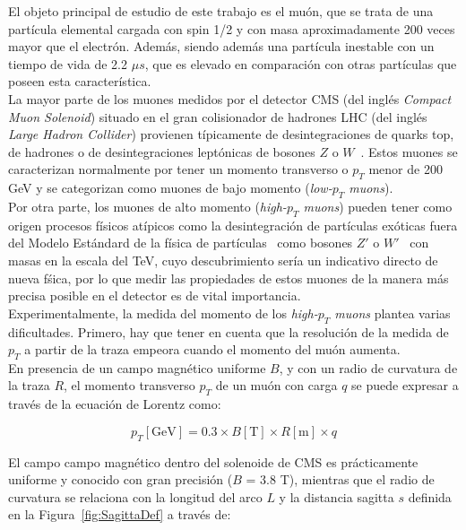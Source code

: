 
El objeto principal de estudio de este trabajo es el mu\'on, que se trata de una part\'icula elemental cargada con spin 1/2 y con masa aproximadamente 200 veces mayor que el electr\'on. Adem\'as, siendo adem\'as una part\'icula inestable con un tiempo de vida de 2.2 $\mu s$, que es elevado en comparaci\'on con otras part\'iculas que poseen esta caracter\'istica. \\

La mayor parte de los muones medidos por el detector CMS (del ingl\'es \textit{Compact Muon Solenoid}) situado en el gran colisionador de hadrones LHC (del ingl\'es \textit{Large Hadron Collider}) provienen t\'ipicamente de desintegraciones de quarks top, de hadrones o de desintegraciones lept\'onicas de bosones $Z$ o $W$~\cite{PhysRevD.98.030001}. Estos muones se caracterizan normalmente por tener un momento transverso o $p_{T}$ menor de 200 GeV y se categorizan como muones de bajo momento (\textit{low-$p_{T}$ muons}). \\
Por otra parte, los muones de alto momento (\textit{high-$p_{T}$ muons}) pueden tener como origen procesos f\'isicos at\'ipicos como la desintegraci\'on de part\'iculas ex\'oticas fuera del Modelo Est\'andard de la f\'isica de part\'iculas~\cite{gaillard1999standard} como bosones $Z'$ o $W'$~\cite{CMS-PAS-EXO-19-019,2017278} con masas en la escala del TeV, cuyo descubrimiento ser\'ia un indicativo directo de nueva f\'sica, por lo que medir las propiedades de estos muones de la manera m\'as precisa posible en el detector es de vital importancia. \\

Experimentalmente, la medida del momento de los \textit{high-$p_{T}$ muons} plantea varias dificultades. Primero, hay que tener en cuenta que la resoluci\'on de la medida de $p_{T}$ a partir de la traza empeora cuando el momento del mu\'on aumenta. \\
En presencia de un campo magn\'etico uniforme $B$, y con un radio de curvatura de la traza $R$, el momento transverso $p_{T}$ de un mu\'on con carga $q$ se puede expresar a trav\'es de la ecuaci\'on de Lorentz como:

\begin{equation}
  p_{T}[\text{GeV}] = 0.3 \times B[\text{T}] \times R[\text{m}] \times q
\label{eq:pTvsRadius}
\end{equation}

El campo campo magn\'etico dentro del solenoide de CMS es pr\'acticamente uniforme y conocido con gran precisi\'on ($B$ = 3.8 T), mientras que el radio de curvatura se relaciona con la longitud del arco $L$ y la distancia sagitta $s$ definida en la Figura~\ref{fig:SagittaDef} a trav\'es de:

